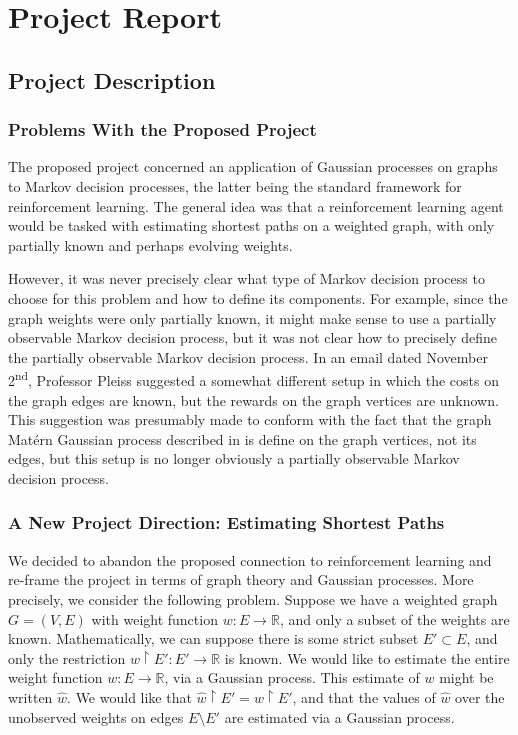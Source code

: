 

\section{Project Report}

\subsection{Project Description}

\subsubsection{Problems With the Proposed Project}

The proposed project concerned an application of Gaussian processes on graphs to Markov decision processes, the latter being the standard framework for reinforcement learning. The general idea was that a reinforcement learning agent would be tasked with estimating shortest paths on a weighted graph, with only partially known and perhaps evolving weights.

However, it was never precisely clear what type of Markov decision process to choose for this problem and how to define its components. For example, since the graph weights were only partially known, it might make sense to use a partially observable Markov decision process, but it was not clear how to precisely define the partially observable Markov decision process. In an email dated November 2\textsuperscript{nd}, Professor Pleiss suggested a somewhat different setup in which the costs on the graph edges are known, but the rewards on the graph vertices are unknown. This suggestion was presumably made to conform with the fact that the graph Mat\'{e}rn Gaussian process described in \cite{pmlr-v130-borovitskiy21a} is define on the graph vertices, not its edges, but this setup is no longer obviously a partially observable Markov decision process.

\subsubsection{A New Project Direction: Estimating Shortest Paths}

We decided to abandon the proposed connection to reinforcement learning and re-frame the project in terms of graph theory and Gaussian processes. More precisely, we consider the following problem. Suppose we have a weighted graph $G = (V, E)$ with weight function $w \colon E \to \mathbb R$, and only a subset of the weights are known. Mathematically, we can suppose there is some strict subset $E' \subset E$, and only the restriction $w \restriction E' \colon E' \to \mathbb R$ is known. We would like to estimate the entire weight function $w \colon E \to \mathbb R$, via a Gaussian process. This estimate of $w$ might be written $\hat w$. We would like that $\hat w \restriction E' = w \restriction E'$, and that the values of $\hat w$ over the unobserved weights on edges $E \setminus E'$ are estimated via a Gaussian process.

